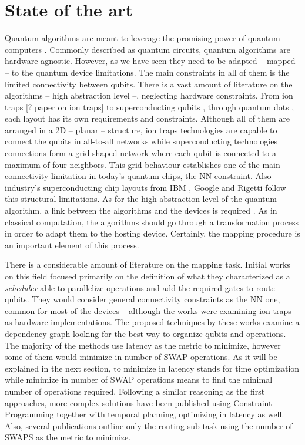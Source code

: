 \section{State of the art}
\label{sec:org86d0b90}
Quantum algorithms are meant to leverage the promising power of quantum computers \cite{coles18:quant_algor_implem_begin}.
Commonly described as quantum circuits, quantum algorithms are hardware agnostic.
However, as we have seen they need to be adapted -- mapped -- to the quantum device limitations.
The main constraints in all of them is the limited connectivity between qubits.
There is a vast amount of literature on the algorithms -- high abstraction level --, neglecting hardware constraints.
From ion traps [? paper on ion traps] to superconducting qubits \cite{Barends_2014,Versluis_2017}, through quantum dots \cite{Hill_2015,Li_2018}, each layout has its own requirements and constraints.
Although all of them are arranged in a 2D -- planar -- structure, ion traps technologies are capable to connect the qubits in all-to-all networks while superconducting technologies connections form a grid shaped network where each qubit is connected to a maximum of four neighbors.
This grid behaviour establishes one of the main connectivity limitation in today's quantum chips, the NN constraint.
Also industry's superconducting chip layouts from IBM \cite{IBM_QX}, Google \cite{boixo16:charac_quant_suprem_near_term_devic} and Rigetti \cite{Sete_2016} follow this structural limitations.
As for the high abstraction level of the quantum algorithm, a link between the algorithms and the devices is required \cite{Fu_2016}.
As in classical computation, the algorithms should go through a transformation process in order to adapt them to the hosting device.
Certainly, the mapping procedure is an important element of this process.

There is a considerable amount of literature on the mapping task.
Initial works on this field \cite{Metodi_2006,Whitney_2007,Bahreini_2015} focused primarily on the definition of what they characterized as a \emph{scheduler} able to parallelize operations and add the required gates to route qubits.
They would consider general connectivity constraints as the NN one, common for most of the devices -- although the works were examining ion-traps as hardware implementations.
The proposed techniques by these works examine a dependency graph looking for the best way to organize qubits and operations.
The majority of the methods use latency as the metric to minimize, however some of them \cite{Farghadan_2017} would minimize in number of SWAP operations.
As it will be explained in the next section, to minimize in latency stands for time optimization while minimize in number of SWAP operations means to find the minimal number of operations required.
Following a similar reasoning as the first approaches, more complex solutions \cite{booth18:compar_integ_const_progr_tempor} have been published using Constraint Programming together with temporal planning, optimizing in latency as well.
Also, several publications \cite{Lye_2015,Wille_2016} outline only the routing sub-task using the number of SWAPS as the metric to minimize.


